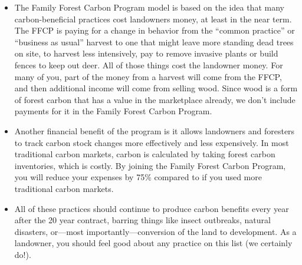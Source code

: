 \documentclass{article}\usepackage[]{graphicx}\usepackage[]{color}
\begin{document}
\begin{itemize}
  \item The Family Forest Carbon Program model is based on the idea that many carbon-beneficial practices cost landowners money, at least in the near term. The FFCP is paying for a change in behavior from the ``common practice'' or ``business as usual'' harvest to one that might leave more standing dead trees on site, to harvest less intensively, pay to remove invasive plants or build fences to keep out deer. All of those things cost the landowner money. For many of you, part of the money from a harvest will come from the FFCP, and then additional income will come from selling wood. Since wood is a form of forest carbon that has a value in the marketplace already, we don't include payments for it in the Family Forest Carbon Program.

  \item Another financial benefit of the program is it allows landowners and foresters to track carbon stock changes more effectively and less expensively. In most traditional carbon markets, carbon is calculated by taking forest carbon inventories, which is costly. By joining the Family Forest Carbon Program, you will reduce your expenses by 75\% compared to if you used more traditional carbon markets. 

  \item All of these practices should continue to produce carbon benefits every year after the 20 year contract, barring things like insect outbreaks, natural disasters, or---most importantly---conversion of the land to development. As a landowner, you should feel good about any practice on this list (we certainly do!).

  \end{itemize}
\end{document}
